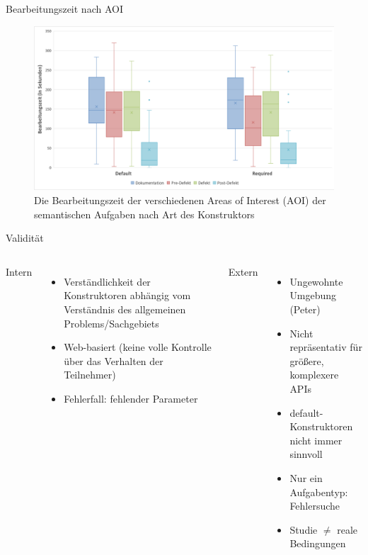 \documentclass[10pt]{beamer}
\begin{document}
	\begin{frame}{Bearbeitungszeit nach AOI}
		\begin{figure}
			\includegraphics[scale=0.39]{graphics/box_time-aoi_sem.png}
			\caption{\label{fig:box_time-aoi_sem.png} Die Bearbeitungszeit der verschiedenen Areas of Interest (AOI) der semantischen Aufgaben nach Art des Konstruktors}
		\end{figure}
	\end{frame}

	\begin{frame}{Validität}
		\begin{columns}[T,onlytextwidth]
	
			Intern
			\begin{itemize}
				\item Verständlichkeit der Konstruktoren abhängig vom Verständnis des allgemeinen Problems/Sachgebiets
				\item Web-basiert (keine volle Kontrolle über das Verhalten der Teilnehmer)
				\item Fehlerfall: fehlender Parameter
			\end{itemize}
		
			Extern
			\begin{itemize}
				\item Ungewohnte Umgebung (Peter)
				\item Nicht repräsentativ für größere, komplexere APIs
				\item default-Konstruktoren nicht immer sinnvoll
				\item Nur ein Aufgabentyp: Fehlersuche
				\item Studie $\neq$ reale Bedingungen
			\end{itemize}
		\end{columns}	
	
	\end{frame}
\end{document}
